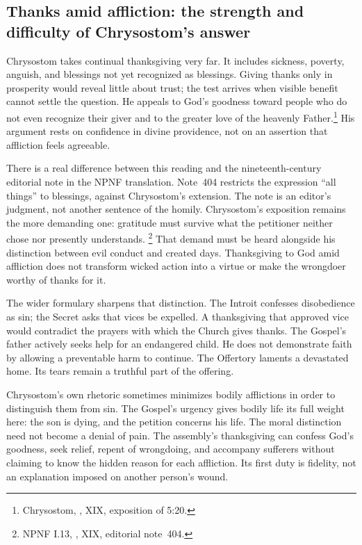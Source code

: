 \subsection{Thanks amid affliction: the strength and difficulty of Chrysostom's answer}
Chrysostom takes continual thanksgiving very far. It includes sickness,
poverty, anguish, and blessings not yet recognized as blessings. Giving
thanks only in prosperity would reveal little about trust; the test
arrives when visible benefit cannot settle the question. He appeals to
God's goodness toward people who do not even recognize their giver and
to the greater love of the heavenly Father.\footnote{Chrysostom,
, XIX, exposition of 5:20.}
His argument rests on confidence in divine providence, not on an assertion
that affliction feels agreeable.

There is a real difference between this reading and the nineteenth-century
editorial note in the NPNF translation. Note~404 restricts the expression
``all things'' to blessings, against Chrysostom's extension. The note is
an editor's judgment, not another sentence of the homily. Chrysostom's
exposition remains the more demanding one: gratitude must survive what
the petitioner neither chose nor presently understands.
\footnote{NPNF I.13, , XIX, editorial note~404.}
That demand must be heard alongside his distinction between evil conduct
and created days. Thanksgiving to God amid affliction does not transform
wicked action into a virtue or make the wrongdoer worthy of thanks for it.

The wider formulary sharpens that distinction. The Introit confesses
disobedience as sin; the Secret asks that vices be expelled. A thanksgiving
that approved vice would contradict the prayers with which the Church
gives thanks. The Gospel's father actively seeks help for an endangered
child. He does not demonstrate faith by allowing a preventable harm to
continue. The Offertory laments a devastated home. Its tears remain a
truthful part of the offering.

Chrysostom's own rhetoric sometimes minimizes bodily afflictions in order
to distinguish them from sin. The Gospel's urgency gives bodily life its
full weight here: the son is dying, and the petition concerns his life.
The moral distinction need not become a denial of pain. The assembly's
thanksgiving can confess God's goodness, seek relief, repent of wrongdoing,
and accompany sufferers without claiming to know the hidden reason for
each affliction. Its first duty is fidelity, not an explanation imposed
on another person's wound.

